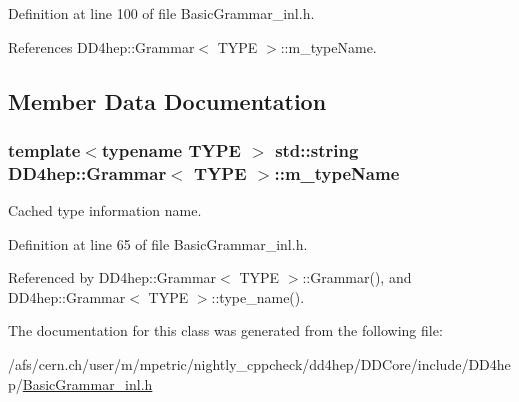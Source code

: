 Definition at line 100 of file BasicGrammar\_\-inl.h.

References DD4hep::Grammar$<$ TYPE $>$::m\_\-typeName.

\subsection{Member Data Documentation}
\hypertarget{class_d_d4hep_1_1_grammar_a10842e3b2f4549f2f8f2b0306e17a43d}{
\subsubsection[{m\_\-typeName}]{\setlength{\rightskip}{0pt plus 5cm}template$<$typename TYPE $>$ std::string {\bf DD4hep::Grammar}$<$ TYPE $>$::{\bf m\_\-typeName}}}
\label{class_d_d4hep_1_1_grammar_a10842e3b2f4549f2f8f2b0306e17a43d}


Cached type information name. 

Definition at line 65 of file BasicGrammar\_\-inl.h.

Referenced by DD4hep::Grammar$<$ TYPE $>$::Grammar(), and DD4hep::Grammar$<$ TYPE $>$::type\_\-name().

The documentation for this class was generated from the following file:\begin{DoxyCompactItemize}
\item 
/afs/cern.ch/user/m/mpetric/nightly\_\-cppcheck/dd4hep/DDCore/include/DD4hep/\hyperlink{_basic_grammar__inl_8h}{BasicGrammar\_\-inl.h}\end{DoxyCompactItemize}

